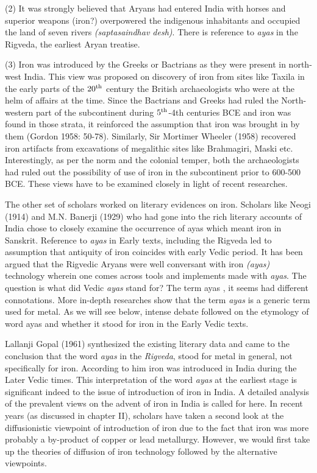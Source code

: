  (2) It was strongly believed that Aryans had entered India with horses and superior weapons (iron?) overpowered the indigenous inhabitants and occupied the land of seven rivers \textit{(saptasaindhav desh)}. There is reference to \textit{ayas} in the Rigveda, the earliest Aryan treatise. 
 
 (3) Iron was introduced by the Greeks or Bactrians as they were present in north-west India. This view was proposed on discovery of iron from sites like Taxila in the early parts of the $20^{\rm th}$ century the British archaeologists who were at the helm of affairs at the time. Since the Bactrians and Greeks had ruled the North-western part of the subcontinent during $5^{\rm th}$-4th centuries BCE and iron was found in those strata, it reinforced the assumption that iron was brought in by them (Gordon 1958: 50-78). Similarly, Sir Mortimer Wheeler (1958) recovered iron artifacts from excavations of megalithic sites like Brahmagiri, Maski etc. Interestingly, as per the norm and the colonial temper, both the archaeologists had ruled out the possibility of use of iron in the subcontinent prior to 600-500 BCE. These views have to be examined closely in light of recent researches. 
 
The other set of scholars worked on literary evidences on iron. Scholars like Neogi (1914) and M.N. Banerji (1929) who had gone into the rich literary accounts of India chose to closely examine the occurrence of ayas which meant iron in Sanskrit. Reference to \textit{ayas} in Early texts, including the Rigveda led to assumption that antiquity of iron coincides with early Vedic period. It has been argued that the Rigvedic Aryans were well conversant with iron \textit{(ayas)} technology wherein one comes across tools and implements made with \textit{ayas}. The question is what did Vedic \textit{ayas} stand for? The term ayas , it seems had different connotations. More in-depth researches show that the term \textit{ayas} is a generic term used for metal. As we will see below, intense debate followed on the etymology of word ayas and whether it stood for iron in the Early Vedic texts.


Lallanji Gopal (1961) synthesized the existing literary data and came to the conclusion that the word \textit{ayas} in the \textit{Rigveda}, stood for metal in general, not specifically for iron. According to him iron was introduced in India during the Later Vedic times. This interpretation of the word \textit{ayas} at the earliest stage is significant indeed to the issue of introduction of iron in India. A detailed analysis of the prevalent views on the advent of iron in India is called for here. In recent years (as discussed in chapter II), scholars have taken a second look at the diffusionistic viewpoint of introduction of iron due to the fact that iron was more probably a by-product of copper or lead metallurgy. However, we would first take up the theories of diffusion of iron technology followed by the alternative viewpoints. 

